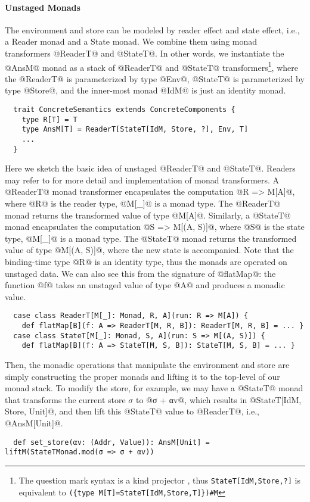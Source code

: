 \paragraph{Unstaged Monads}
The environment and store can be modeled by reader effect and state effect,
i.e., a Reader monad and a State monad. We combine them using monad transformers
@ReaderT@ and @StateT@.
In other words, we instantiate the @AnsM@ monad as a stack of @ReaderT@ and @StateT@
transformers\footnote{The question mark syntax is a kind projector
  \cite{kindprojector}, thus \texttt{StateT[IdM,Store,?]} is equivalent to \newline
  \texttt{(\{type M[T]=StateT[IdM,Store,T]\})\#M}}, where the @ReaderT@ is
parameterized by type @Env@, @StateT@ is parameterized by type @Store@, and the
inner-most monad @IdM@ is just an identity monad.

\begin{lstlisting}
  trait ConcreteSemantics extends ConcreteComponents {
    type R[T] = T
    type AnsM[T] = ReaderT[StateT[IdM, Store, ?], Env, T]
    ...
  }
\end{lstlisting}

Here we sketch the basic idea of unstaged @ReaderT@ and @StateT@. Readers may
refer to \cite{DBLP:conf/popl/LiangHJ95, Chiusano:2014:FPS:2688794} for more detail 
and implementation of monad transformers.
A @ReaderT@ monad transformer encapsulates the computation @R => M[A]@, where
@R@ is the reader type, @M[_]@ is a monad type. The @ReaderT@ monad returns the
transformed value of type @M[A]@. Similarly, a @StateT@ monad encapsulates the
computation @S => M[(A, S)]@, where @S@ is the state type, @M[_]@ is a monad
type. The @StateT@ monad returns the transformed value of type @M[(A, S)]@,
where the new state is accompanied.
Note that the binding-time type @R@ is an identity type, thus the monads are
operated on unstaged data. We can also see this from the signature of @flatMap@:
the function @f@ takes an unstaged value of type @A@ and produces a monadic
value.

\begin{lstlisting}
  case class ReaderT[M[_]: Monad, R, A](run: R => M[A]) {
    def flatMap[B](f: A => ReaderT[M, R, B]): ReaderT[M, R, B] = ... }
  case class StateT[M[_]: Monad, S, A](run: S => M[(A, S)]) {
    def flatMap[B](f: A => StateT[M, S, B]): StateT[M, S, B] = ... }
\end{lstlisting}

Then, the monadic operations that manipulate the environment and store are
simply constructing the proper monads and lifting it to the top-level of our
monad stack. To modify the store, for example, we may have a @StateT@ monad that
transforms the current store $\sigma$ to @σ + αv@, which results in
@StateT[IdM, Store, Unit]@, and then lift this @StateT@ value to @ReaderT@,
i.e., @AnsM[Unit]@.
\begin{lstlisting}
  def set_store(αv: (Addr, Value)): AnsM[Unit] = liftM(StateTMonad.mod(σ => σ + αv))
\end{lstlisting}

